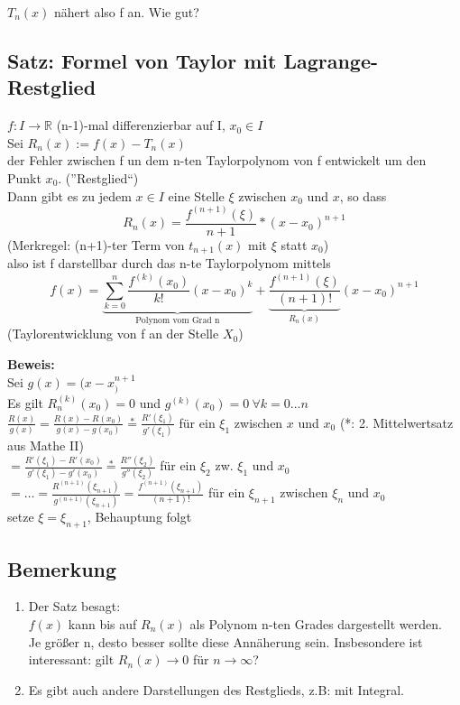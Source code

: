 $T_n(x)$ nähert also f an. Wie gut?

\subsection{Satz: Formel von Taylor mit Lagrange-Restglied}
$f:I\rightarrow \mathbb{R}$ (n-1)-mal differenzierbar auf I, $x_0\in I$\\
Sei $R_n(x):=f(x)-T_n(x)$\\
der Fehler zwischen f un dem n-ten Taylorpolynom von f entwickelt um den Punkt $x_0$. (''Restglied``)\\
Dann gibt es zu jedem $x\in I$ eine Stelle $\xi$ zwischen $x_0$ und $x$, so dass \[R_n(x)=\frac{f^{(n+1)}(\xi)}{n+1}*(x-x_0)^{n+1}\]
(Merkregel: (n+1)-ter Term von $t_{n+1}(x)$ mit $\xi$ statt $x_0$)\\
also ist f darstellbar durch das n-te Taylorpolynom mittels \[f(x)=\underbrace{\sum_{k=0}^n \frac{f^{(k)}(x_0)}{k!}(x-x_0)^k}_{\text{Polynom vom Grad n}} + \underbrace{\frac{f^{(n+1)}(\xi)}{(n+1)!}}_{R_n(x)}(x-x_0)^{n+1}\]
(Taylorentwicklung von f an der Stelle $X_0$)

\textbf{Beweis:}\\
Sei $g(x)=(x-x_)^{n+1}$\\
Es gilt $R_n^{(k)}(x_0)=0$ und $g^{(k)}(x_0)=0 \ \forall k=0\dots n$\\
$\frac{R(x)}{g(x)}=\frac{R(x)-R(x_0)}{g(x)-g(x_0)} \stackrel{*}{=} \frac{R'(\xi_1)}{g'(\xi_1)}$ für ein $\xi_1$ zwischen $x$ und $x_0$ (*: 2. Mittelwertsatz aus Mathe II)\\
$=\frac{R'(\xi_1)-R'(x_0)}{g'(\xi_1)-g'(x_0)} \stackrel{*}{=} \frac{R''(\xi_2)}{g''(\xi_2)}$ für ein $\xi_2$ zw. $\xi_1$ und $x_0$\\
$=\dots = \frac{R^{(n+1)}(\xi_{n+1})}{g^{(n+1)}(\xi_{n+1})} = \frac{f^{(n+1)}(\xi_{n+1})}{(n+1)!}$ für ein $\xi_{n+1}$ zwischen $\xi_n$ und $x_0$\\
setze $\xi=\xi_{n+1}$, Behauptung folgt

\subsection{Bemerkung}
\begin{enumerate}
	\item
	Der Satz besagt:\\
	$f(x)$ kann bis auf $R_n(x)$ als Polynom n-ten Grades dargestellt werden.\\
	Je größer n, desto besser sollte diese Annäherung sein. Insbesondere ist interessant: gilt $R_n(x)\rightarrow 0$ für $n\rightarrow \infty$?
	
	\item
	Es gibt auch andere Darstellungen des Restglieds, z.B: mit Integral.
\end{enumerate}


